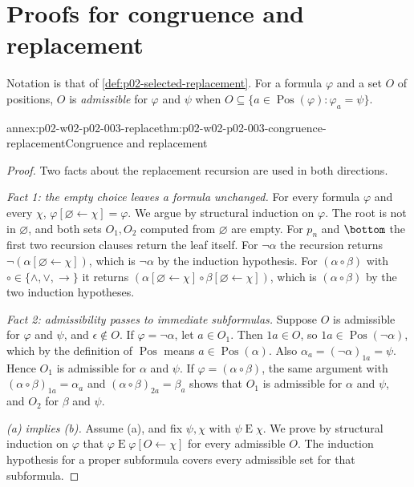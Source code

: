 \section{Proofs for congruence and replacement}
\label{sec:annex-p02-w02-p02-003-exercise-link}

Notation is that of \cref{def:p02-selected-replacement}.  For a formula
\(\varphi\) and a set \(O\) of positions, \(O\) is \emph{admissible} for
\(\varphi\) and \(\psi\) when
\(O\subseteq\{a\in\operatorname{Pos}(\varphi):\varphi_a=\psi\}\).

\begin{annexitem}{annex:p02-w02-p02-003-replace}{thm:p02-w02-p02-003-congruence-replacement}{Congruence and replacement}
\begin{proof}
Two facts about the replacement recursion are used in both directions.

\emph{Fact 1: the empty choice leaves a formula unchanged.}  For every
formula \(\varphi\) and every \(\chi\), \(\varphi[\varnothing\leftarrow\chi]=\varphi\).
We argue by structural induction on \(\varphi\).  The root is not in
\(\varnothing\), and both sets \(O_1,O_2\) computed from \(\varnothing\) are
empty.  For \(p_n\) and \(\bottom\) the first two recursion clauses return the
leaf itself.  For \(\neg\alpha\) the recursion returns
\(\neg(\alpha[\varnothing\leftarrow\chi])\), which is \(\neg\alpha\) by the
induction hypothesis.  For \((\alpha\circ\beta)\) with
\(\circ\in\{\land,\lor,\to\}\) it returns
\((\alpha[\varnothing\leftarrow\chi]\circ\beta[\varnothing\leftarrow\chi])\),
which is \((\alpha\circ\beta)\) by the two induction hypotheses.

\emph{Fact 2: admissibility passes to immediate subformulas.}  Suppose \(O\)
is admissible for \(\varphi\) and \(\psi\), and \(\epsilon\notin O\).  If
\(\varphi=\neg\alpha\), let \(a\in O_1\).  Then \(1a\in O\), so
\(1a\in\operatorname{Pos}(\neg\alpha)\), which by the definition of
\(\operatorname{Pos}\) means \(a\in\operatorname{Pos}(\alpha)\).  Also
\(\alpha_a=(\neg\alpha)_{1a}=\psi\).  Hence \(O_1\) is admissible for
\(\alpha\) and \(\psi\).  If \(\varphi=(\alpha\circ\beta)\), the same argument
with \((\alpha\circ\beta)_{1a}=\alpha_a\) and
\((\alpha\circ\beta)_{2a}=\beta_a\) shows that \(O_1\) is admissible for
\(\alpha\) and \(\psi\), and \(O_2\) for \(\beta\) and \(\psi\).

\emph{(a) implies (b).}  Assume (a), and fix \(\psi,\chi\) with
\(\psi\mathrel{E}\chi\).  We prove by structural induction on \(\varphi\)
that \(\varphi\mathrel{E}\varphi[O\leftarrow\chi]\) for every admissible
\(O\).  The induction hypothesis for a proper subformula covers every
admissible set for that subformula.


\end{proof}
\end{annexitem}

